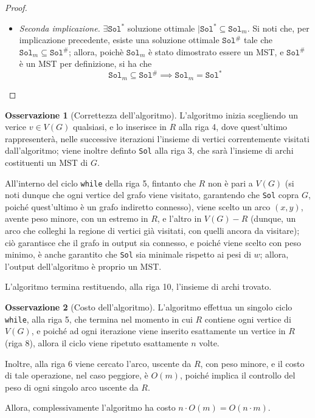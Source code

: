 \documentclass[14pt]{extreport}
\theoremstyle{definition}
\theoremstyle{definition}
\newtheorem{remark}{Osservazione}[subsection]
\begin{document}
\begin{proof}
\begin{itemize}
        \item[] \textit{Seconda implicazione.} $\exists \texttt{Sol}^*$ soluzione ottimale $\mid \texttt{Sol}^* \subseteq \texttt{Sol}_m$. Si noti che, per implicazione precedente, esiste una soluzione ottimale $\texttt{Sol}^\#$ tale che $\texttt{Sol}_m \subseteq \texttt{Sol}^\#$; allora, poichè $\texttt{Sol}_m$ è stato dimostrato essere un MST, e $\texttt{Sol}^\#$ è un MST per definizione, si ha che $$\texttt{Sol}_m \subseteq \texttt{Sol}^\# \implies \texttt{Sol}_m = \texttt{Sol}^*$$
    \end{itemize}
\end{proof}

\begin{remark}[Correttezza dell'algoritmo]
    L'algoritmo inizia scegliendo un verice $v \in V(G)$ qualsiasi, e lo inserisce in $R$ alla riga 4, dove quest'ultimo rappresenterà, nelle successive iterazioni l'insieme di vertici correntemente visitati dall'algoritmo; viene inoltre definto \texttt{Sol} alla riga 3, che sarà l'insieme di archi costituenti un MST di $G$.

    All'interno del ciclo \texttt{while} della riga 5, fintanto che $R$ non è pari a $V(G)$ (si noti dunque che ogni vertice del grafo viene visitato, garantendo che \texttt{Sol} copra $G$, poiché quest'ultimo è un grafo indiretto connesso), viene scelto un arco $(x, y)$, avente peso minore, con un estremo in $R$, e l'altro in $V(G) - R$ (dunque, un arco che colleghi la regione di vertici già visitati, con quelli ancora da visitare); ciò garantisce che il grafo in output sia connesso, e poiché viene scelto con peso minimo, è anche garantito che \texttt{Sol} sia minimale rispetto ai pesi di $w$; allora, l'output dell'algoritmo è proprio un MST.

    L'algoritmo termina restituendo, alla riga 10, l'insieme di archi trovato.
\end{remark}

\begin{remark}[Costo dell'algoritmo]
    L'algoritmo effettua un singolo ciclo \texttt{while}, alla riga 5, che termina nel momento in cui $R$ contiene ogni vertice di $V(G)$, e poiché ad ogni iterazione viene inserito esattamente un vertice in $R$ (riga 8), allora il ciclo viene ripetuto esattamente $n$ volte.

    Inoltre, alla riga 6 viene cercato l'arco, uscente da $R$, con peso minore, e il costo di tale operazione, nel caso peggiore, è $O(m)$, poiché implica il controllo del peso di ogni singolo arco uscente da $R$.

    Allora, complessivamente l'algoritmo ha costo $n \cdot O(m) = O(n \cdot m)$.
\end{remark}
\end{document}

